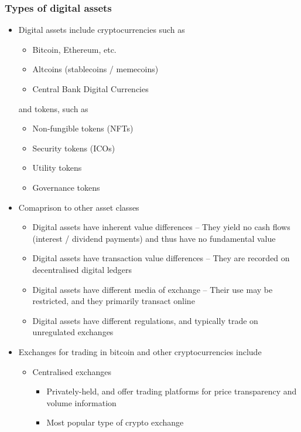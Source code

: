 \documentclass[../notes_compiled.tex]{subfiles}
\begin{document}
\subsubsection{Types of digital assets}
\begin{itemize}
\item Digital assets include cryptocurrencies such as 
\begin{multicols}{2}
\begin{itemize}
\item Bitcoin, Ethereum, etc.
\item Altcoins (stablecoins / memecoins)
\item Central Bank Digital Currencies
\end{itemize}
\end{multicols}
and tokens, such as
\begin{multicols}{2}
\begin{itemize}
\item Non-fungible tokens (NFTs)
\item Security tokens (ICOs)
\item Utility tokens
\item Governance tokens
\end{itemize}
\end{multicols}
\item Comaprison to other asset classes
\begin{itemize}
\item Digital assets have inherent value differences -- They yield no cash flows (interest / dividend payments) and thus have no fundamental value
\item Digital assets have transaction value differences -- They are recorded on decentralised digital ledgers
\item Digital assets have different media of exchange -- Their use may be restricted, and they primarily transact online
\item Digital assets have different regulations, and typically trade on unregulated exchanges
\end{itemize}
\item Exchanges for trading in bitcoin and other cryptocurrencies include
\begin{itemize}
\item Centralised exchanges
\begin{itemize}
\item Privately-held, and offer trading platforms for price transparency and volume information
\item Most popular type of crypto exchange

\end{itemize}
\end{itemize}
\end{itemize}
\end{document}
